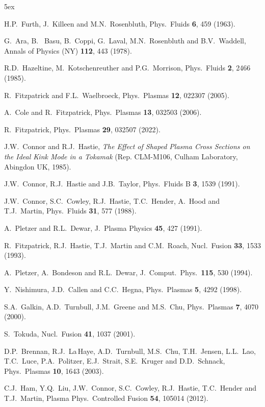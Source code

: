 \documentclass[12pt,prb,aps]{revtex4-1}
\begin{document}
\begin{thebibliography}{99}\baselineskip 5ex

 H.P.~Furth,  J.~Killeen and M.N.~Rosenbluth,  Phys.\ Fluids {\bf 6}, 459 (1963).

 G.~Ara, B.~ Basu, B.~Coppi, G.~Laval, M.N.~Rosenbluth and B.V.~Waddell, Annals of Physics (NY) {\bf 112}, 443 (1978). 

 R.D.~Hazeltine, M.~Kotschenreuther and P.G.~Morrison, Phys.\ Fluids {\bf 2}, 2466  (1985). 

 R.~Fitzpatrick and F.L.~Waelbroeck, Phys.\ Plasmas {\bf 12}, 022307 (2005).

 A.~Cole and R.~Fitzpatrick, Phys.\ Plasmas {\bf 13}, 032503 (2006).

 R.~Fitzpatrick, Phys.\ Plasmas {\bf 29}, 032507 (2022).

 J.W.~Connor and R.J.~Hastie, {\em The Effect of Shaped Plasma Cross Sections on the Ideal Kink Mode in a Tokamak}\/ (Rep. CLM-M106, Culham Laboratory, Abingdon UK, 1985).

 J.W.~Connor, R.J.~Hastie and J.B.~Taylor, Phys.\ Fluids B {\bf 3}, 1539 (1991).

 J.W.~Connor,  S.C.~Cowley, R.J.~Hastie,  T.C.~Hender,  A.~Hood  and T.J.~Martin,  Phys.\ Fluids {\bf 31}, 577 (1988).

 A.~Pletzer and R.L.~Dewar, J.\ Plasma Physics {\bf 45}, 427 (1991).

 R.~Fitzpatrick, R.J.~Hastie, T.J.~Martin and C.M.~Roach, Nucl.\ Fusion {\bf 33}, 1533 (1993).

  A.~Pletzer, A.~Bondeson and R.L.~Dewar, J.\ Comput.\ Phys.\ {\bf 115}, 530 (1994).

 Y.~Nishimura, J.D.~Callen and C.C.~Hegna, Phys.\ Plasmas {\bf 5}, 4292 (1998).

 S.A.~Galkin, A.D.~Turnbull, J.M.~Greene and M.S.~Chu, Phys.\ Plasmas {\bf 7}, 4070 (2000). 

 S.~Tokuda, Nucl.\ Fusion {\bf 41}, 1037 (2001).

 D.P.~Brennan, R.J.~La\,Haye, A.D.~Turnbull, M.S.~Chu, T.H.~Jensen, L.L.~Lao, T.C.~Luce, P.A.~Politzer, E.J.~Strait, S.E.~Kruger and D.D.~Schnack, Phys.\ Plasmas {\bf 10}, 1643 (2003).

  C.J.~Ham, Y.Q.~Liu, J.W.~Connor, S.C.~Cowley, R.J.~Hastie, T.C.~Hender and T.J.~Martin, Plasma Phys.\ Controlled Fusion {\bf 54}, 105014 (2012). 


\end{thebibliography}
\end{document}
